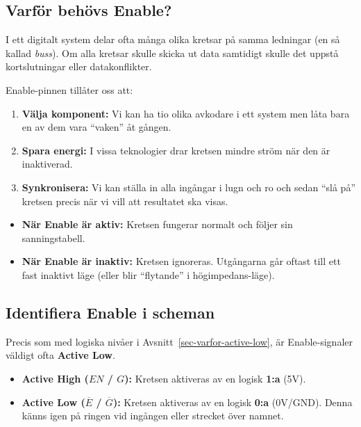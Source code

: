 \documentclass[
  swedish,
  letterpaper,
  oneside,
  openany]{book}
\providecommand{\tightlist}{%
  \setlength{\itemsep}{0pt}\setlength{\parskip}{0pt}}
\begin{document}
\subsection{Varför behövs Enable?}\label{varfuxf6r-behuxf6vs-enable}

I ett digitalt system delar ofta många olika kretsar på samma ledningar
(en så kallad \emph{buss}). Om alla kretsar skulle skicka ut data
samtidigt skulle det uppstå kortslutningar eller datakonflikter.

Enable-pinnen tillåter oss att:

\begin{enumerate}
\def\labelenumi{\arabic{enumi}.}
\tightlist
\item
  \textbf{Välja komponent:} Vi kan ha tio olika avkodare i ett system
  men låta bara en av dem vara ``vaken'' åt gången.
\item
  \textbf{Spara energi:} I vissa teknologier drar kretsen mindre ström
  när den är inaktiverad.
\item
  \textbf{Synkronisera:} Vi kan ställa in alla ingångar i lugn och ro
  och sedan ``slå på'' kretsen precis när vi vill att resultatet ska
  visas.
\end{enumerate}

\begin{itemize}
\tightlist
\item
  \textbf{När Enable är aktiv:} Kretsen fungerar normalt och följer sin
  sanningstabell.
\item
  \textbf{När Enable är inaktiv:} Kretsen ignoreras. Utgångarna går
  oftast till ett fast inaktivt läge (eller blir ``flytande'' i
  högimpedans-läge).
\end{itemize}

\subsection{Identifiera Enable i
scheman}\label{identifiera-enable-i-scheman}

Precis som med logiska nivåer i Avsnitt~\ref{sec-varfor-active-low}, är
Enable-signaler väldigt ofta \textbf{Active Low}.

\begin{itemize}
\tightlist
\item
  \textbf{Active High (\(EN\) / \(G\)):} Kretsen aktiveras av en logisk
  \textbf{1:a} (5V).
\item
  \textbf{Active Low (\(\overline{E}\) / \(\overline{G}\)):} Kretsen
  aktiveras av en logisk \textbf{0:a} (0V/GND). Denna känns igen på
  ringen vid ingången eller strecket över namnet.
\end{itemize}
\end{document}
